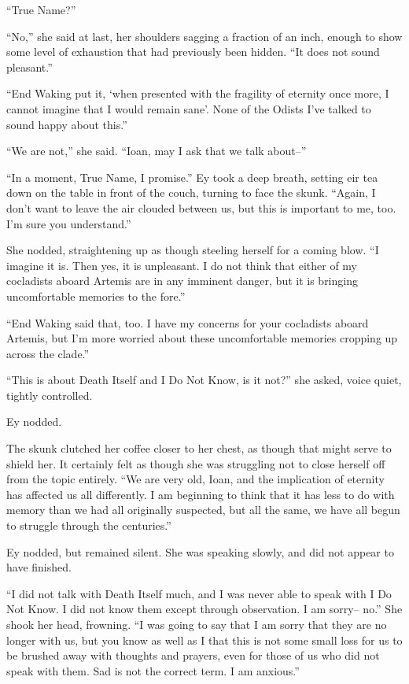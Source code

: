 ``True Name?''

``No,'' she said at last, her shoulders sagging a fraction of an inch, enough to show some level of exhaustion that had previously been hidden. ``It does not sound pleasant.''

``End Waking put it, `when presented with the fragility of eternity once more, I cannot imagine that I would remain sane'. None of the Odists I've talked to sound happy about this.''

``We are not,'' she said. ``Ioan, may I ask that we talk about--''

``In a moment, True Name, I promise.'' Ey took a deep breath, setting eir tea down on the table in front of the couch, turning to face the skunk. ``Again, I don't want to leave the air clouded between us, but this is important to me, too. I'm sure you understand.''

She nodded, straightening up as though steeling herself for a coming blow. ``I imagine it is. Then yes, it is unpleasant. I do not think that either of my cocladists aboard Artemis are in any imminent danger, but it is bringing uncomfortable memories to the fore.''

``End Waking said that, too. I have my concerns for your cocladists aboard Artemis, but I'm more worried about these uncomfortable memories cropping up across the clade.''

``This is about Death Itself and I Do Not Know, is it not?'' she asked, voice quiet, tightly controlled.

Ey nodded.

The skunk clutched her coffee closer to her chest, as though that might serve to shield her. It certainly felt as though she was struggling not to close herself off from the topic entirely. ``We are very old, Ioan, and the implication of eternity has affected us all differently. I am beginning to think that it has less to do with memory than we had all originally suspected, but all the same, we have all begun to struggle through the centuries.''

Ey nodded, but remained silent. She was speaking slowly, and did not appear to have finished.

``I did not talk with Death Itself much, and I was never able to speak with I Do Not Know. I did not know them except through observation. I am sorry-- no.'' She shook her head, frowning. ``I was going to say that I am sorry that they are no longer with us, but you know as well as I that this is not some small loss for us to be brushed away with thoughts and prayers, even for those of us who did not speak with them. Sad is not the correct term. I am anxious.''

